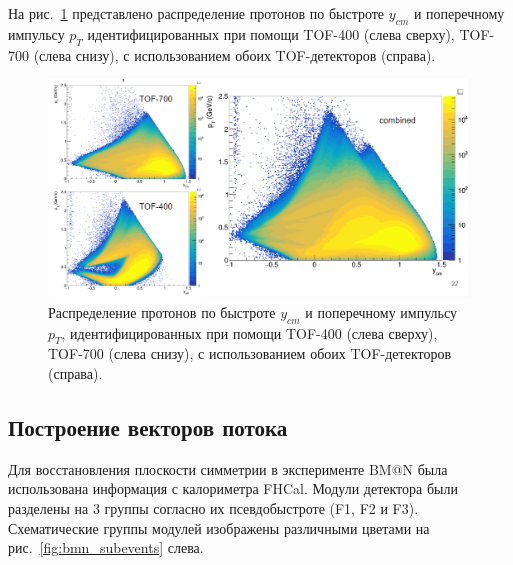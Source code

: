 На рис.~\ref{fig:bmn_pt_y} представлено распределение протонов по быстроте $y_{cm}$ и поперечному импульсу $p_T$ идентифицированных при помощи TOF-400 (слева сверху), TOF-700 (слева снизу), с использованием обоих TOF-детекторов (справа).
%
\begin{figure}[ht]
\begin{center}
\includegraphics[width=0.95\linewidth]{images/bmn_pt_y_acceptance.png}
\caption{Распределение протонов по быстроте $y_{cm}$ и поперечному импульсу $p_T$, идентифицированных при помощи TOF-400 (слева сверху), TOF-700 (слева снизу), с использованием обоих TOF-детекторов (справа).}
\label{fig:bmn_pt_y}
\end{center}
\end{figure}


\subsection{Построение векторов потока}

Для восстановления плоскости симметрии в эксперименте BM@N была использована информация с калориметра FHCal.
Модули детектора были разделены на 3 группы согласно их псевдобыстроте (F1, F2 и F3).
Схематические группы модулей изображены различными цветами на рис.~\ref{fig:bmn_subevents} слева.

